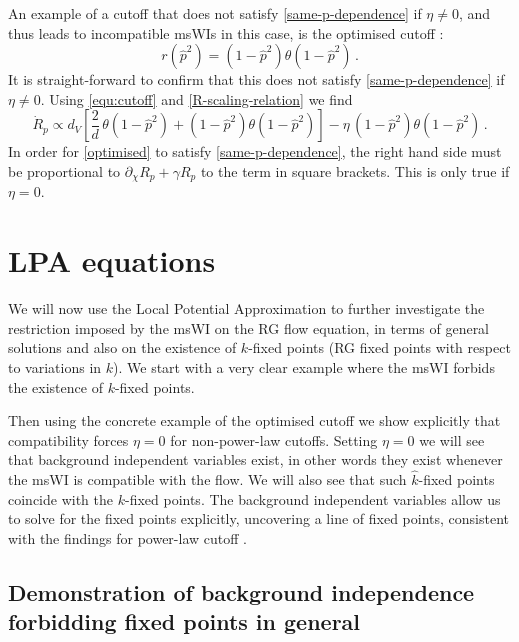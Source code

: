 \documentclass[11pt]{book} %
\newcommand{\be}{\begin{equation}}
\newcommand{\ee}{\end{equation}}
\begin{document}
An example of a cutoff that does not satisfy \eqref{same-p-dependence} if $\eta\ne0$, and thus leads to incompatible msWIs in this case, is the optimised cutoff \cite{opt1,opt3}:
\be 
\label{optimised}
r(\hat{p}^2) = (1-\hat{p}^2)\theta(1-\hat{p}^2)\,.
\ee
It is straight-forward to confirm that this does not satisfy \eqref{same-p-dependence} if $\eta\ne0$. Using \eqref{equ:cutoff} and \eqref{R-scaling-relation} we find
\be 
\dot{R}_p \propto d_V \left[ \frac{2}{d}\,\theta(1-\hat{p}^2) + (1-\hat{p}^2)\theta(1-\hat{p}^2)\right] - \eta\, (1-\hat{p}^2)\theta(1-\hat{p}^2)\,.
\ee
In order for \eqref{optimised} to satisfy \eqref{same-p-dependence}, the right hand side must be proportional to $\partial_\chi R_p+\gamma R_p$ \ie to the term in square brackets. This is only true if $\eta=0$.


\section{LPA equations}

We will now use the Local Potential Approximation to further investigate the restriction imposed by the msWI on the RG flow equation, in terms of general solutions and also on the existence of $k$-fixed points (\ie RG fixed points with respect to variations in $k$). We start with a very clear example where the msWI forbids the existence of $k$-fixed points. 

Then using the concrete example of the optimised cutoff we show explicitly that compatibility forces $\eta=0$ for non-power-law cutoffs. Setting $\eta=0$ we will see that background independent variables exist, in other words they exist whenever the msWI is compatible with the flow. We will also see that such $\hat{k}$-fixed points coincide with the $k$-fixed points. The background independent variables allow us to solve for the fixed points explicitly, uncovering a line of fixed points, consistent with the findings for power-law cutoff \cite{Dietz2016}.

\subsection{Demonstration of background independence forbidding fixed points in general}\label{sec:forbids}
\end{document}

